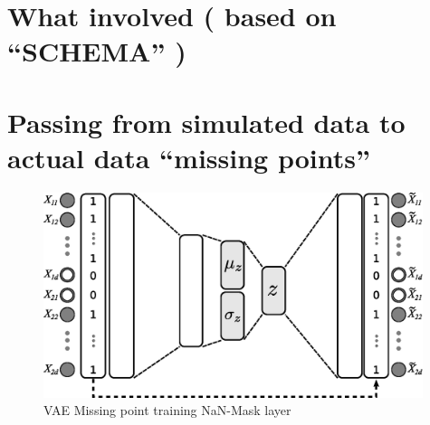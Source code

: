\section{What involved ( based on “SCHEMA” )} %




\section{Passing from simulated data to actual data  “missing points”  }

\begin{figure}
    \centering
    \includegraphics[height=6cm]{img/6_T_Hunch/VAE_MISSING.eps}
    \caption{VAE Missing point training NaN-Mask layer}
    \label{fig:6_vae_missing}
\end{figure}



